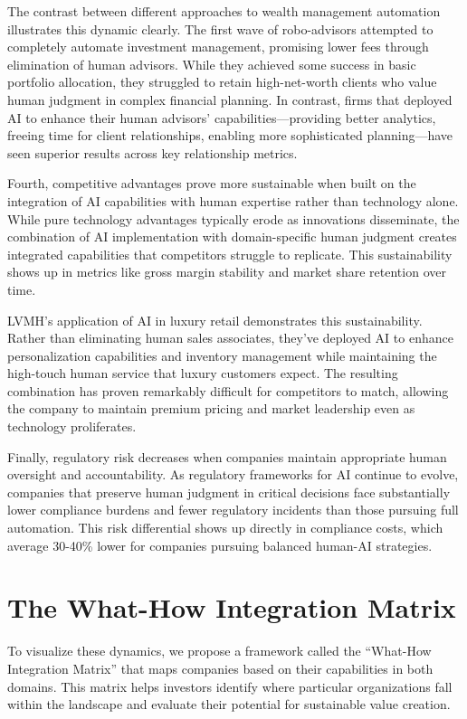 \documentclass[
  Letterpaper,
]{scrbook}
\begin{document}
The contrast between different approaches to wealth management
automation illustrates this dynamic clearly. The first wave of
robo-advisors attempted to completely automate investment management,
promising lower fees through elimination of human advisors. While they
achieved some success in basic portfolio allocation, they struggled to
retain high-net-worth clients who value human judgment in complex
financial planning. In contrast, firms that deployed AI to enhance their
human advisors' capabilities---providing better analytics, freeing time
for client relationships, enabling more sophisticated planning---have
seen superior results across key relationship metrics.

Fourth, competitive advantages prove more sustainable when built on the
integration of AI capabilities with human expertise rather than
technology alone. While pure technology advantages typically erode as
innovations disseminate, the combination of AI implementation with
domain-specific human judgment creates integrated capabilities that
competitors struggle to replicate. This sustainability shows up in
metrics like gross margin stability and market share retention over
time.

LVMH's application of AI in luxury retail demonstrates this
sustainability. Rather than eliminating human sales associates, they've
deployed AI to enhance personalization capabilities and inventory
management while maintaining the high-touch human service that luxury
customers expect. The resulting combination has proven remarkably
difficult for competitors to match, allowing the company to maintain
premium pricing and market leadership even as technology proliferates.

Finally, regulatory risk decreases when companies maintain appropriate
human oversight and accountability. As regulatory frameworks for AI
continue to evolve, companies that preserve human judgment in critical
decisions face substantially lower compliance burdens and fewer
regulatory incidents than those pursuing full automation. This risk
differential shows up directly in compliance costs, which average
30-40\% lower for companies pursuing balanced human-AI strategies.

\section{The What-How Integration
Matrix}\label{the-what-how-integration-matrix}

To visualize these dynamics, we propose a framework called the
``What-How Integration Matrix'' that maps companies based on their
capabilities in both domains. This matrix helps investors identify where
particular organizations fall within the landscape and evaluate their
potential for sustainable value creation.
\end{document}

